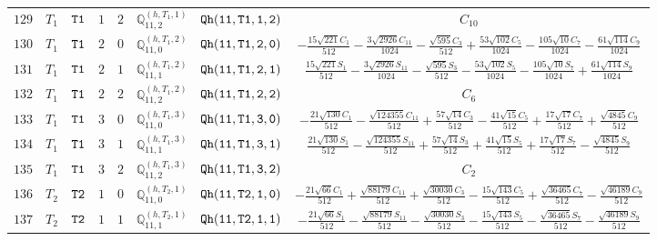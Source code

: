 \documentclass[fleqn,8pt]{jsarticle}
\begin{document}
\begin{table}[ht!]
\begin{center}
\begin{tabular}{cccccccc}
$ 129 $ & $ T_{1} $ & $ {\tt T1} $ & $ 1 $ & $ 2 $ & $ \mathbb{Q}_{11,2}^{(h,T_{1},1)} $ & $ {\tt Qh(11,T1,1,2)} $ & $ C_{10} $ \\
$ 130 $ & $ T_{1} $ & $ {\tt T1} $ & $ 2 $ & $ 0 $ & $ \mathbb{Q}_{11,0}^{(h,T_{1},2)} $ & $ {\tt Qh(11,T1,2,0)} $ & $ - \frac{15 \sqrt{221} C_{1}}{512} - \frac{3 \sqrt{2926} C_{11}}{1024} - \frac{\sqrt{595} C_{3}}{512} + \frac{53 \sqrt{102} C_{5}}{1024} - \frac{105 \sqrt{10} C_{7}}{1024} - \frac{61 \sqrt{114} C_{9}}{1024} $ \\
$ 131 $ & $ T_{1} $ & $ {\tt T1} $ & $ 2 $ & $ 1 $ & $ \mathbb{Q}_{11,1}^{(h,T_{1},2)} $ & $ {\tt Qh(11,T1,2,1)} $ & $ \frac{15 \sqrt{221} S_{1}}{512} - \frac{3 \sqrt{2926} S_{11}}{1024} - \frac{\sqrt{595} S_{3}}{512} - \frac{53 \sqrt{102} S_{5}}{1024} - \frac{105 \sqrt{10} S_{7}}{1024} + \frac{61 \sqrt{114} S_{9}}{1024} $ \\
$ 132 $ & $ T_{1} $ & $ {\tt T1} $ & $ 2 $ & $ 2 $ & $ \mathbb{Q}_{11,2}^{(h,T_{1},2)} $ & $ {\tt Qh(11,T1,2,2)} $ & $ C_{6} $ \\
$ 133 $ & $ T_{1} $ & $ {\tt T1} $ & $ 3 $ & $ 0 $ & $ \mathbb{Q}_{11,0}^{(h,T_{1},3)} $ & $ {\tt Qh(11,T1,3,0)} $ & $ - \frac{21 \sqrt{130} C_{1}}{512} - \frac{\sqrt{124355} C_{11}}{512} + \frac{57 \sqrt{14} C_{3}}{512} - \frac{41 \sqrt{15} C_{5}}{512} + \frac{17 \sqrt{17} C_{7}}{512} + \frac{\sqrt{4845} C_{9}}{512} $ \\
$ 134 $ & $ T_{1} $ & $ {\tt T1} $ & $ 3 $ & $ 1 $ & $ \mathbb{Q}_{11,1}^{(h,T_{1},3)} $ & $ {\tt Qh(11,T1,3,1)} $ & $ \frac{21 \sqrt{130} S_{1}}{512} - \frac{\sqrt{124355} S_{11}}{512} + \frac{57 \sqrt{14} S_{3}}{512} + \frac{41 \sqrt{15} S_{5}}{512} + \frac{17 \sqrt{17} S_{7}}{512} - \frac{\sqrt{4845} S_{9}}{512} $ \\
$ 135 $ & $ T_{1} $ & $ {\tt T1} $ & $ 3 $ & $ 2 $ & $ \mathbb{Q}_{11,2}^{(h,T_{1},3)} $ & $ {\tt Qh(11,T1,3,2)} $ & $ C_{2} $ \\
$ 136 $ & $ T_{2} $ & $ {\tt T2} $ & $ 1 $ & $ 0 $ & $ \mathbb{Q}_{11,0}^{(h,T_{2},1)} $ & $ {\tt Qh(11,T2,1,0)} $ & $ - \frac{21 \sqrt{66} C_{1}}{512} + \frac{\sqrt{88179} C_{11}}{512} + \frac{\sqrt{30030} C_{3}}{512} - \frac{15 \sqrt{143} C_{5}}{512} + \frac{\sqrt{36465} C_{7}}{512} - \frac{\sqrt{46189} C_{9}}{512} $ \\
$ 137 $ & $ T_{2} $ & $ {\tt T2} $ & $ 1 $ & $ 1 $ & $ \mathbb{Q}_{11,1}^{(h,T_{2},1)} $ & $ {\tt Qh(11,T2,1,1)} $ & $ - \frac{21 \sqrt{66} S_{1}}{512} - \frac{\sqrt{88179} S_{11}}{512} - \frac{\sqrt{30030} S_{3}}{512} - \frac{15 \sqrt{143} S_{5}}{512} - \frac{\sqrt{36465} S_{7}}{512} - \frac{\sqrt{46189} S_{9}}{512} $ \\

\end{tabular}
\end{center}
\end{table}
\end{document}
